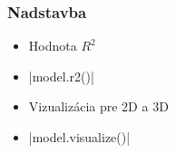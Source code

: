\documentclass[presentation.tex]{subfiles}
\begin{document}
    \begin{frame}[fragile]
        \frametitle{Nadstavba}
        \begin{multicols}{2}
            \begin{itemize}
                    \item Hodnota $R^2$
                    \item \pyth|model.r2()|
            \end{itemize}

            \columnbreak

            \begin{itemize}
                    \item Vizualizácia pre 2D a 3D
                    \item \pyth|model.visualize()|
            \end{itemize}
        \end{multicols}


\end{frame}
\end{document}
